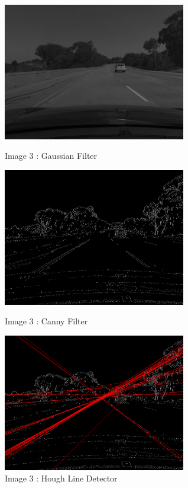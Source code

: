 \documentclass[12pt,a4paper]{report}
\begin{document}
\begin{figure}[!htb]
  \centering
  \includegraphics[height=6cm]{result_img/img3_q1.png}
  \caption{Image 3 : Gaussian Filter}
  \includegraphics[height=6cm]{result_img/img3_q2.png}
  \caption{Image 3 : Canny Filter}
  \includegraphics[height=6cm]{result_img/img3_q3.png}
  \caption{Image 3 : Hough Line Detector}
\end{figure}
\end{document}
